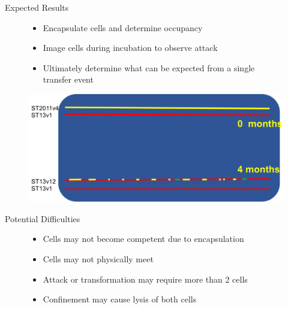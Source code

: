 \documentclass{beamer}
\begin{document}
\begin{frame}{Expected Results}
\begin{figure}
\begin{itemize}
\item Encapsulate cells and determine occupancy
\item Image cells during incubation to observe attack
\item Ultimately determine what can be expected from a single transfer event
\end{itemize}
\end{figure}
\begin{figure}
\includegraphics[width=0.8\linewidth]{images/transfer-vivo.png}\\
\hspace*{11pt}\hbox{\scriptsize {}}
\end{figure}
\end{frame}

\begin{frame}{Potential Difficulties}
\begin{figure}
\begin{itemize}
\item Cells may not become competent due to encapsulation
\item Cells may not physically meet
\item Attack or transformation may require more than 2 cells
\item Confinement may cause lysis of both cells
 \end{itemize}
\end{figure}
\end{frame}


\end{document}
